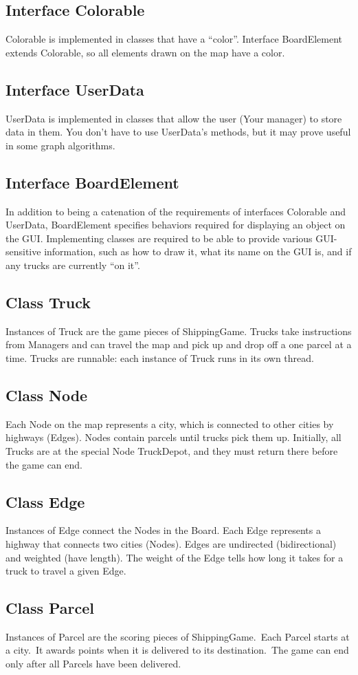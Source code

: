\documentclass[11pt]{article}
\begin{document}
\subsection{Interface Colorable}
Colorable  is implemented in classes that have a ``color''. Interface BoardElement extends Colorable, so  all elements drawn on the map have a color.
\subsection{Interface UserData}
UserData is implemented in classes that allow the user (Your manager) to store data in them. You don't have to use UserData's methods, but it may prove useful in some graph algorithms.
\subsection{Interface BoardElement}
In addition to being a catenation of the requirements of interfaces Colorable and UserData, BoardElement specifies behaviors required for displaying an object on the GUI. Implementing classes are required to be able to provide various GUI-sensitive information, such as how to draw it, what its name on the GUI is, and if any trucks are currently ``on it''.
\subsection{Class Truck}
Instances of Truck are the game pieces of ShippingGame. Trucks take instructions from Managers and can travel the map and pick up and drop off a one parcel at a time. Trucks are runnable: each instance of Truck runs in its own thread.
\subsection{Class Node}
Each Node on the map represents a city, which is connected to other cities by highways (Edges). Nodes contain parcels until trucks pick them up. Initially, all Trucks are at the special Node TruckDepot, and they must return there before the game can end.
\subsection{Class Edge}
Instances of Edge connect the Nodes in the Board. Each Edge represents a highway that connects two cities (Nodes). Edges are undirected (bidirectional) and weighted (have length). The weight of the Edge tells how long it takes for a truck to travel a given Edge.
\subsection{Class Parcel}
Instances of Parcel are the scoring pieces of ShippingGame.\ Each Parcel starts at a city.\ It awards points when it is  delivered to its destination.\ The game can end only after all Parcels have been delivered.
\end{document}
